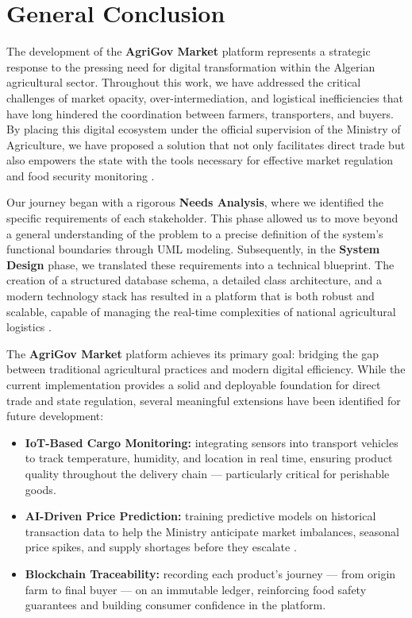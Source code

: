 \chapter*{General Conclusion}

The development of the \textbf{AgriGov Market} platform represents a strategic response to the pressing need for digital transformation within the Algerian agricultural sector. Throughout this work, we have addressed the critical challenges of market opacity, over-intermediation, and logistical inefficiencies that have long hindered the coordination between farmers, transporters, and buyers. By placing this digital ecosystem under the official supervision of the Ministry of Agriculture, we have proposed a solution that not only facilitates direct trade but also empowers the state with the tools necessary for effective market regulation and food security monitoring \cite{Chetibietal2026}.

Our journey began with a rigorous \textbf{Needs Analysis}, where we identified the specific requirements of each stakeholder. This phase allowed us to move beyond a general understanding of the problem to a precise definition of the system's functional boundaries through UML modeling. Subsequently, in the \textbf{System Design} phase, we translated these requirements into a technical blueprint. The creation of a structured database schema, a detailed class architecture, and a modern technology stack has resulted in a platform that is both robust and scalable, capable of managing the real-time complexities of national agricultural logistics \cite{Belhadi2024}.

The \textbf{AgriGov Market} platform achieves its primary goal: bridging the gap between traditional agricultural practices and modern digital efficiency. While the current implementation provides a solid and deployable foundation for direct trade and state regulation, several meaningful extensions have been identified for future development:

\begin{itemize}
	
	\item \textbf{IoT-Based Cargo Monitoring:} integrating sensors into transport vehicles to track temperature, humidity, and location in real time, ensuring product quality throughout the delivery chain — particularly critical for perishable goods.
	
	\item \textbf{AI-Driven Price Prediction:} training predictive models on historical transaction data to help the Ministry anticipate market imbalances, seasonal price spikes, and supply shortages before they escalate \cite{Seltetal2026}.

	\item \textbf{Blockchain Traceability:} recording each product's journey — from origin farm to final buyer — on an immutable ledger, reinforcing food safety guarantees and building consumer confidence in the platform.
	
\end{itemize}


